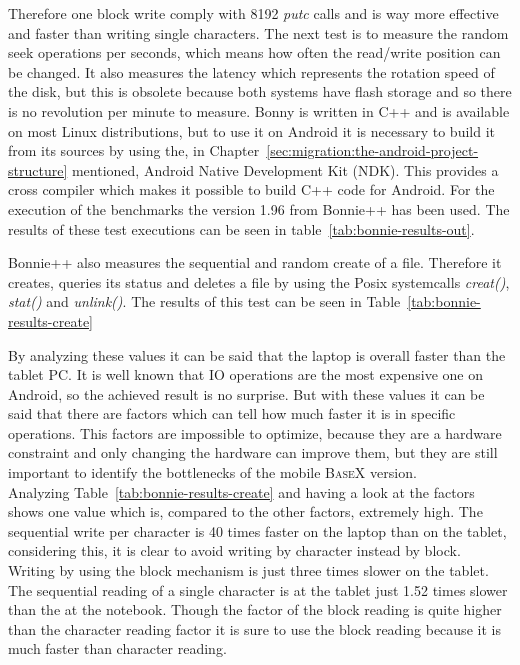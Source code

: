 Therefore one block write comply with 8192 \textit{putc} calls and is way more effective and faster than writing single characters.
The next test is to measure the random seek operations per seconds, which means how often the read/write position can be changed.
It also measures the latency which represents the rotation speed of the disk, but this is obsolete because both systems have flash storage and so there is no revolution per minute to measure.
Bonny is written in C++ and is available on most Linux distributions, but to use it on Android it is necessary to build it from its sources by using the, in Chapter~\ref{sec:migration:the-android-project-structure} mentioned, Android Native Development Kit (NDK).
This provides a cross compiler which makes it possible to build C++ code for Android.
For the execution of the benchmarks the version 1.96 from Bonnie++ has been used.
The results of these test executions can be seen in table~\ref{tab:bonnie-results-out}.

Bonnie++ also measures the sequential and random create of a file.
Therefore it creates, queries its status and deletes a file by using the Posix systemcalls \textit{creat()}, \textit{stat()} and \textit{unlink()}.
The results of this test can be seen in Table~\ref{tab:bonnie-results-create}

By analyzing these values it can be said that the laptop is overall faster than the tablet PC.
It is well known that IO operations are the most expensive one on Android, so the achieved result is no surprise. 
But with these values it can be said that there are factors which can tell how much faster it is in specific operations.
This factors are impossible to optimize, because they are a hardware constraint and only changing the hardware can improve them, but they are still important to identify the bottlenecks of the mobile \textsc{BaseX} version.\\
Analyzing Table~\ref{tab:bonnie-results-create} and having a look at the factors shows one value which is, compared to the other factors, extremely high.
The sequential write per character is 40 times faster on the laptop than on the tablet, considering this, it is clear to avoid writing by character instead by block.
Writing by using the block mechanism is just three times slower on the tablet.
The sequential reading of a single character is at the tablet just 1.52 times slower than the at the notebook.
Though the factor of the block reading is quite higher than the character reading factor it is sure to use the block reading because it is much faster than character reading.
